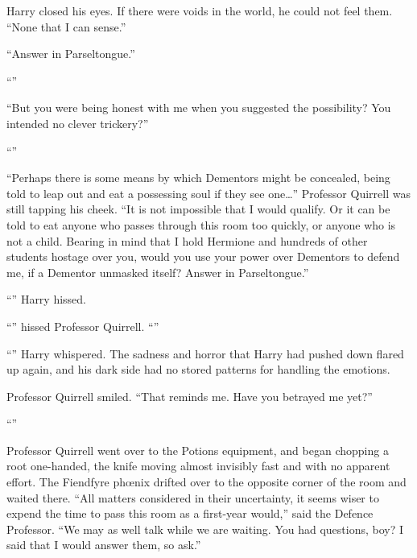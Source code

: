 Harry closed his eyes. If there were voids in the world, he could not feel them. “None that I can sense.”

“Answer in Parseltongue.”

“”

“But you were being honest with me when you suggested the possibility? You intended no clever trickery?”

“”

“Perhaps there is some means by which Dementors might be concealed, being told to leap out and eat a possessing soul if they see one…” Professor Quirrell was still tapping his cheek. “It is not impossible that I would qualify. Or it can be told to eat anyone who passes through this room too quickly, or anyone who is not a child. Bearing in mind that I hold Hermione and hundreds of other students hostage over you, would you use your power over Dementors to defend me, if a Dementor unmasked itself? Answer in Parseltongue.”

“” Harry hissed.

“” hissed Professor Quirrell. “”

“” Harry whispered. The sadness and horror that Harry had pushed down flared up again, and his dark side had no stored patterns for handling the emotions. 

Professor Quirrell smiled. “That reminds me. Have you betrayed me yet?”

“”

Professor Quirrell went over to the Potions equipment, and began chopping a root one-handed, the knife moving almost invisibly fast and with no apparent effort. The Fiendfyre phœnix drifted over to the opposite corner of the room and waited there. “All matters considered in their uncertainty, it seems wiser to expend the time to pass this room as a first-year would,” said the Defence Professor. “We may as well talk while we are waiting. You had questions, boy? I said that I would answer them, so ask.”

